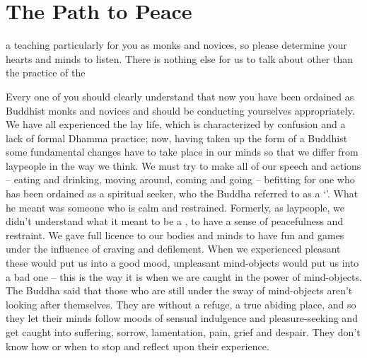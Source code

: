 
\chapter{The Path to Peace}

 a teaching particularly for you as monks and novices, so please determine your hearts and minds to listen. There is nothing else for us to talk about other than the practice of the 

Every one of you should clearly understand that now you have been ordained as Buddhist monks and novices and should be conducting yourselves appropriately. We have all experienced the lay life, which is characterized by confusion and a lack of formal Dhamma practice; now, having taken up the form of a Buddhist  some fundamental changes have to take place in our minds so that we differ from laypeople in the way we think. We must try to make all of our speech and actions -- eating and drinking, moving around, coming and going -- befitting for one who has been ordained as a spiritual seeker, who the Buddha referred to as a `'. What he meant was someone who is calm and restrained. Formerly, as laypeople, we didn't understand what it meant to be a , to have a sense of peacefulness and restraint. We gave full licence to our bodies and minds to have fun and games under the influence of craving and defilement. When we experienced pleasant  these would put us into a good mood, unpleasant mind-objects would put us into a bad one -- this is the way it is when we are caught in the power of mind-objects. The Buddha said that those who are still under the sway of mind-objects aren't looking after themselves. They are without a refuge, a true abiding place, and so they let their minds follow moods of sensual indulgence and pleasure-seeking and get caught into suffering, sorrow, lamentation, pain, grief and despair. They don't know how or when to stop and reflect upon their experience.

